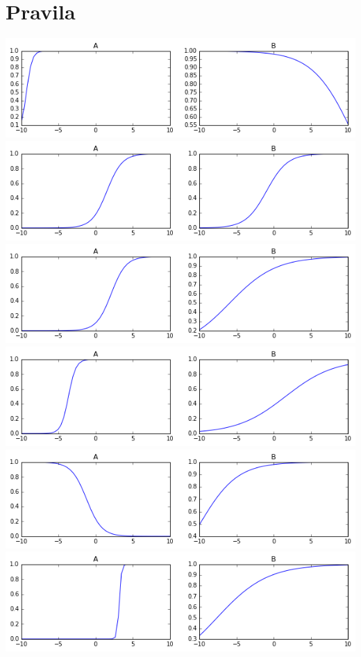 \documentclass[a4paper, 11pt]{article}
\begin{document}
\section*{Pravila}
\includegraphics[width=\textwidth]{set1}
\includegraphics[width=\textwidth]{set2}
\includegraphics[width=\textwidth]{set3}
\includegraphics[width=\textwidth]{set4}
\includegraphics[width=\textwidth]{set5}
\includegraphics[width=\textwidth]{set6}
\end{document}
